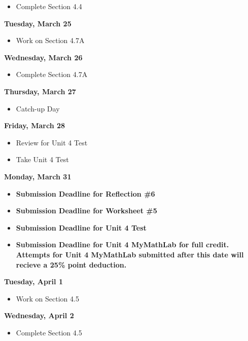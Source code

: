 \documentclass[11pt]{article}
\begin{document}
\begin{itemize}
\item Complete Section 4.4
\end{itemize}

\textbf{Tuesday, March 25}

\begin{itemize}
\item Work on Section 4.7A
\end{itemize}

\textbf{Wednesday, March 26}

\begin{itemize}
\item Complete Section 4.7A
\end{itemize}

\textbf{Thursday, March 27}

\begin{itemize}
\item Catch-up Day
\end{itemize}

\textbf{Friday, March 28}

\begin{itemize}
\item Review for Unit 4 Test
\item Take Unit 4 Test
\end{itemize}

\textbf{Monday, March 31}

\begin{itemize}
\item \textbf{Submission Deadline for Reflection \#6}
\item \textbf{Submission Deadline for Worksheet \#5}
\item \textbf{Submission Deadline for Unit 4 Test}
\item \textbf{Submission Deadline for Unit 4 MyMathLab for full credit. Attempts for Unit 4 MyMathLab submitted after this date will recieve a 25\% point deduction.}
\end{itemize}

\textbf{Tuesday, April 1}

\begin{itemize}
\item Work on Section 4.5
\end{itemize}

\textbf{Wednesday, April 2}

\begin{itemize}
\item Complete Section 4.5
\end{itemize}
\end{document}
